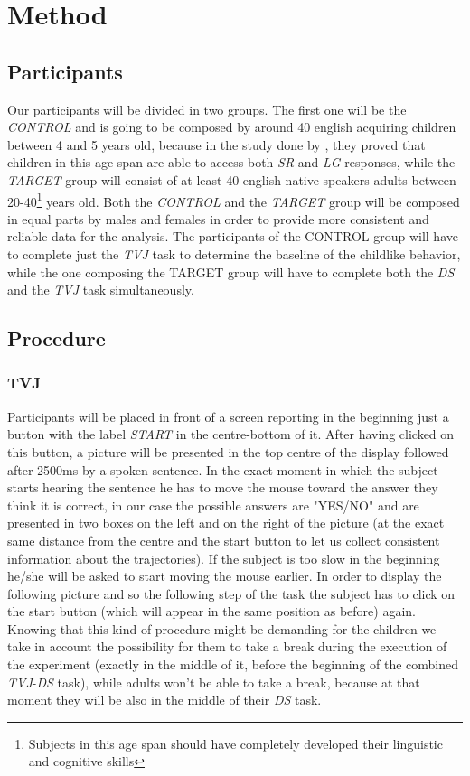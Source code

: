 \documentclass[10pt, a4]{article}
\begin{document}
\section{Method}
\subsection{Participants}
Our participants will be divided in two groups. The first one will be the \textit{CONTROL} and is going to be
composed by around 40 english acquiring children between 4 and 5 years old, because in the study done by \cite{minai2012hinders}, they
proved that children in this age span are able to access both \textit{SR} and \textit{LG} responses, while the \textit{TARGET} group will consist
of at least 40 english native speakers adults between 20-40\footnote{Subjects in this age span should have completely developed
their linguistic and cognitive skills} years old. Both the \textit{CONTROL} and the \textit{TARGET} group will be composed in equal
parts by males and females in order to provide more consistent and reliable data for the analysis.
The participants of the CONTROL group will have to complete just the \textit{TVJ} task to determine the baseline of the childlike behavior,
while the one composing the TARGET group will have to complete both the \textit{DS} and the \textit{TVJ} task simultaneously.

\subsection{Procedure}
\subsubsection{TVJ}
Participants will be placed in front of a screen reporting in the beginning just a button with the label \textit{START}
in the centre-bottom of it. After having clicked on this button, a picture will be presented in the top centre of the
display followed after 2500ms by a spoken sentence. In the exact moment in which the subject starts hearing the sentence
he has to move the mouse toward the answer they think it is correct, in our case the possible answers are "YES/NO"
and are presented in two boxes on the left and on the right of the picture (at the exact same distance from the centre and the start button
to let us collect consistent information about the trajectories). If the subject is too slow in the beginning he/she will be asked to
start moving the mouse earlier. In order to display the following picture and so the following step of the task the subject has to click
on the start button (which will appear in the same position as before) again. Knowing that this kind of procedure might be demanding
for the children we take in account the possibility for them to take a break during the execution of the experiment (exactly in the middle of it, before
the beginning of the combined \textit{TVJ}-\textit{DS} task), while adults won't be able to take a break, because at that moment
they will be also in the middle of their \textit{DS} task.
\end{document}
